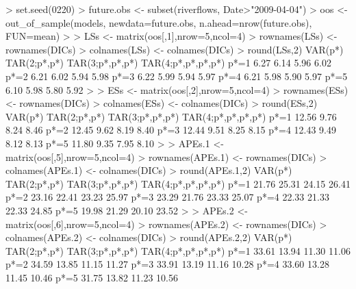 \begin{example}
> set.seed(0220)
> future.obs <- subset(riverflows, Date>"2009-04-04")                  
> oos <- out_of_sample(models, newdata=future.obs, n.ahead=nrow(future.obs), FUN=mean)
> 
> LSs <- matrix(oos[,1],nrow=5,ncol=4)
> rownames(LSs) <- rownames(DICs)
> colnames(LSs) <- colnames(DICs)
> round(LSs,2)
     VAR(p*) TAR(2;p*,p*) TAR(3;p*,p*,p*) TAR(4;p*,p*,p*,p*)
p*=1    6.27         6.14            5.96               6.02
p*=2    6.21         6.02            5.94               5.98
p*=3    6.22         5.99            5.94               5.97
p*=4    6.21         5.98            5.90               5.97
p*=5    6.10         5.98            5.80               5.92
> 
> ESs <- matrix(oos[,2],nrow=5,ncol=4)
> rownames(ESs) <- rownames(DICs)
> colnames(ESs) <- colnames(DICs)
> round(ESs,2)
     VAR(p*) TAR(2;p*,p*) TAR(3;p*,p*,p*) TAR(4;p*,p*,p*,p*)
p*=1   12.56         9.76            8.24               8.46
p*=2   12.45         9.62            8.19               8.40
p*=3   12.44         9.51            8.25               8.15
p*=4   12.43         9.49            8.12               8.13
p*=5   11.80         9.35            7.95               8.10
>
> APEs.1 <- matrix(oos[,5],nrow=5,ncol=4)
> rownames(APEs.1) <- rownames(DICs)
> colnames(APEs.1) <- colnames(DICs)
> round(APEs.1,2)
     VAR(p*) TAR(2;p*,p*) TAR(3;p*,p*,p*) TAR(4;p*,p*,p*,p*)
p*=1   21.76        25.31           24.15              26.41
p*=2   23.16        22.41           23.23              25.97
p*=3   23.29        21.76           23.33              25.07
p*=4   22.33        21.33           22.33              24.85
p*=5   19.98        21.29           20.10              23.52
>
> APEs.2 <- matrix(oos[,6],nrow=5,ncol=4)
> rownames(APEs.2) <- rownames(DICs)
> colnames(APEs.2) <- colnames(DICs)
> round(APEs.2,2)
     VAR(p*) TAR(2;p*,p*) TAR(3;p*,p*,p*) TAR(4;p*,p*,p*,p*)
p*=1   33.61        13.94           11.30              11.06
p*=2   34.59        13.85           11.15              11.27
p*=3   33.91        13.19           11.16              10.28
p*=4   33.60        13.28           11.45              10.46
p*=5   31.75        13.82           11.23              10.56
\end{example}
